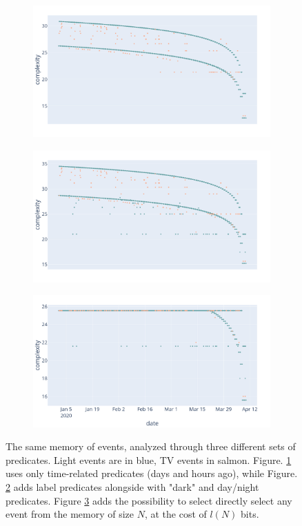 \documentclass[entropy,article,submit,moreauthors,pdftex]{Definitions/mdpi}
\begin{document}
\begin{figure}[!ht]
    \centering
    \begin{subfigure}{\linewidth}
        \centering
        \includegraphics[width=.7\linewidth]{figures/preds_1.png}
        \caption{}
        \label{fig:pred_1}
    \end{subfigure}
    \begin{subfigure}{\linewidth}
        \centering
        \includegraphics[width=.7\linewidth]{figures/preds_2.png}
        \caption{}
        \label{fig:pred_2}
    \end{subfigure}
    \begin{subfigure}{\linewidth}
        \centering
        \includegraphics[width=.7\linewidth]{figures/preds_3.png}
        \caption{}
        \label{fig:pred_3}
    \end{subfigure}
    \caption{The same memory of events, analyzed through three different sets of predicates. Light events are in blue, TV events in salmon. Figure. \ref{fig:pred_1} uses only time-related predicates (days and hours ago), while Figure. \ref{fig:pred_2} adds label predicates alongside with "dark" and day/night predicates. Figure \ref{fig:pred_3} adds the possibility to select directly select any event from the memory of size $N$, at the cost of $l(N)$ bits.}
    \label{fig:3preds}
\end{figure}
\end{document}
